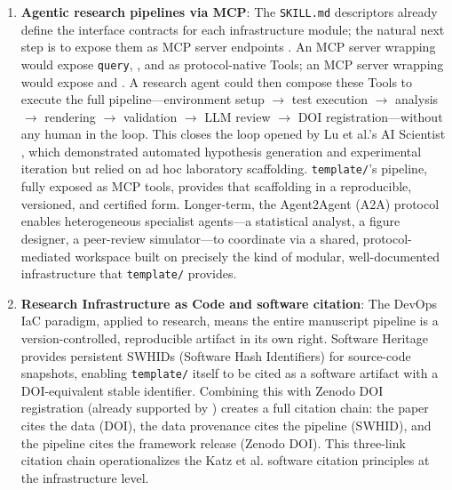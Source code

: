 \documentclass[
]{article}
\begin{document}
\begin{enumerate}
  algorithmic logic and that \texttt{src/} modules do not import from
  \texttt{scripts/}.
\item
  \textbf{Agentic research pipelines via MCP}: The \texttt{SKILL.md}
  descriptors already define the interface contracts for each
  infrastructure module; the natural next step is to expose them as MCP
  server endpoints \citep{anthropic2024mcp}. An MCP server wrapping
   would expose \texttt{query},
  , and  as
  protocol-native Tools; an MCP server wrapping
   would expose
   and .
  A research agent could then compose these Tools to execute the full
  pipeline---environment setup \texorpdfstring{\ensuremath{\to}}{->} test execution \texorpdfstring{\ensuremath{\to}}{->} analysis \texorpdfstring{\ensuremath{\to}}{->} rendering \texorpdfstring{\ensuremath{\to}}{->}
  validation \texorpdfstring{\ensuremath{\to}}{->} LLM review \texorpdfstring{\ensuremath{\to}}{->} DOI registration---without any human in the
  loop. This closes the loop opened by Lu et al.'s AI Scientist
  \citep{lu2024aiscientist}, which demonstrated automated hypothesis
  generation and experimental iteration but relied on ad hoc laboratory
  scaffolding. \texttt{template/}'s pipeline, fully exposed as MCP
  tools, provides that scaffolding in a reproducible, versioned, and
  certified form. Longer-term, the Agent2Agent (A2A) protocol
  \citep{google2025a2a} enables heterogeneous specialist agents---a
  statistical analyst, a figure designer, a peer-review simulator---to
  coordinate via a shared, protocol-mediated workspace built on
  precisely the kind of modular, well-documented infrastructure that
  \texttt{template/} provides.
\item
  \textbf{Research Infrastructure as Code and software citation}: The
  DevOps IaC paradigm, applied to research, means the entire manuscript
  pipeline is a version-controlled, reproducible artifact in its own
  right. Software Heritage \citep{cosmo2020softwareheritage} provides
  persistent SWHIDs (Software Hash Identifiers) for source-code
  snapshots, enabling \texttt{template/} itself to be cited as a
  software artifact with a DOI-equivalent stable identifier. Combining
  this with Zenodo DOI registration (already supported by
  ) creates a full citation chain: the
  paper cites the data (DOI), the data provenance cites the pipeline
  (SWHID), and the pipeline cites the framework release (Zenodo DOI).
  This three-link citation chain operationalizes the Katz et al.
  \citep{katz2021software} software citation principles at the
  infrastructure level.
\end{enumerate}
\end{document}
